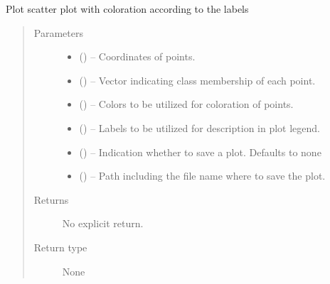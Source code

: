 \documentclass[letterpaper,10pt,english]{sphinxmanual}
\begin{document}
\begin{fulllineitems}
\label{\detokenize{api/ucf.scatter_plot_with_groups:ucf.scatter_plot_with_groups}}
Plot scatter plot with coloration according to the labels
\begin{quote}\begin{description}
\item[{Parameters}] \leavevmode\begin{itemize}
\item {} 
 () -- Coordinates of points.

\item {} 
 () -- Vector indicating class membership of each point.

\item {} 
 () -- Colors to be utilized for coloration of points.

\item {} 
 () -- Labels to be utilized for description in plot legend.

\item {} 
 () -- Indication whether to save a plot. Defaults to none

\item {} 
 () -- Path including the file name where to save the plot.

\end{itemize}

\item[{Returns}] \leavevmode
No explicit return.

\item[{Return type}] \leavevmode
None

\end{description}\end{quote}

\end{fulllineitems}
\end{document}

